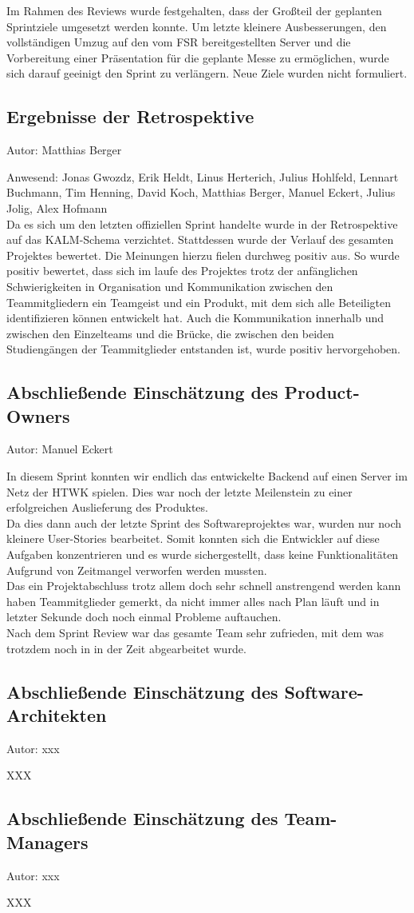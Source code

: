 Im Rahmen des Reviews wurde festgehalten, dass der Großteil der geplanten  Sprintziele umgesetzt werden konnte. Um letzte kleinere Ausbesserungen, den vollständigen Umzug auf den vom FSR bereitgestellten Server und die Vorbereitung einer Präsentation für die geplante Messe zu ermöglichen, wurde sich darauf geeinigt den Sprint zu verlängern. Neue Ziele wurden nicht formuliert.

\subsection{Ergebnisse der Retrospektive}
{\small Autor: Matthias Berger}

Anwesend: Jonas Gwozdz, Erik Heldt, Linus Herterich, Julius Hohlfeld, Lennart Buchmann, Tim Henning, David Koch, Matthias Berger, Manuel Eckert, Julius Jolig, Alex Hofmann\\

Da es sich um den letzten offiziellen Sprint handelte wurde in der Retrospektive auf das KALM-Schema verzichtet. Stattdessen wurde der Verlauf des gesamten Projektes bewertet. Die Meinungen hierzu fielen durchweg positiv aus. So wurde  positiv bewertet, dass sich im laufe des Projektes trotz der anfänglichen Schwierigkeiten in Organisation und Kommunikation zwischen den Teammitgliedern ein Teamgeist und ein Produkt, mit dem sich alle Beteiligten identifizieren können entwickelt hat. Auch die Kommunikation innerhalb und zwischen den Einzelteams und die Brücke, die zwischen den beiden Studiengängen der Teammitglieder entstanden ist, wurde positiv hervorgehoben.

\subsection{Abschließende Einschätzung des Product-Owners}
{\small Autor: Manuel Eckert}

In diesem Sprint konnten wir endlich das entwickelte Backend auf einen Server im Netz der HTWK spielen. Dies war noch der letzte Meilenstein zu einer erfolgreichen Auslieferung des Produktes. \\
Da dies dann auch der letzte Sprint des Softwareprojektes war, wurden nur noch kleinere User-Stories bearbeitet. Somit konnten sich die Entwickler auf diese Aufgaben konzentrieren und es wurde sichergestellt, dass keine Funktionalitäten Aufgrund von Zeitmangel verworfen werden mussten. \\
Das ein Projektabschluss trotz allem doch sehr schnell anstrengend werden kann haben Teammitglieder gemerkt, da nicht immer alles nach Plan läuft und in letzter Sekunde doch noch einmal Probleme auftauchen. \\
Nach dem Sprint Review war das gesamte Team sehr zufrieden, mit dem was trotzdem noch in in der Zeit abgearbeitet wurde. \\ 

\subsection{Abschließende Einschätzung des Software-Architekten}
{\small Autor: xxx}

XXX

\subsection{Abschließende Einschätzung des Team-Managers}
{\small Autor: xxx}

XXX